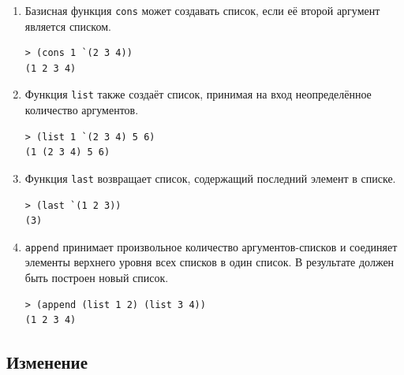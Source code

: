 \begin{enumerate}

\item Базисная функция \texttt{cons} может создавать список, если её второй аргумент является списком.
 
\begin{code}
\begin{verbatim}
> (cons 1 `(2 3 4))
(1 2 3 4)
\end{verbatim}
\end{code}

\item Функция \texttt{list} также создаёт список, принимая на вход неопределённое количество аргументов.

\begin{code}
\begin{verbatim}
> (list 1 `(2 3 4) 5 6)
(1 (2 3 4) 5 6)
\end{verbatim}
\end{code}

\item Функция \texttt{last} возвращает список, содержащий последний элемент в списке.

\begin{code}
\begin{verbatim}
> (last `(1 2 3))
(3)
\end{verbatim}
\end{code}

\item \texttt{append} принимает произвольное количество аргументов-списков и соединяет элементы верхнего уровня всех списков в один список. В результате должен быть построен новый список.

\begin{code}
\begin{verbatim}
> (append (list 1 2) (list 3 4))
(1 2 3 4)
\end{verbatim}
\end{code}

\end{enumerate}

\subsection{Изменение}

